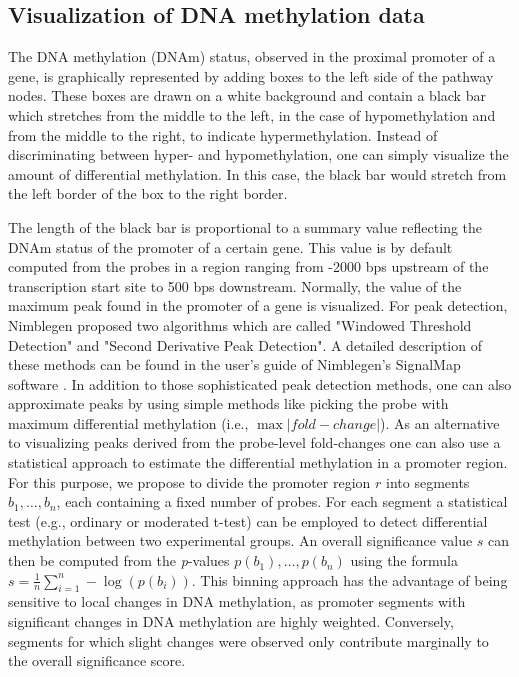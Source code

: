 \documentclass{bioinfo}
\begin{document}
\subsection{Visualization of DNA methylation data}

The DNA methylation (DNAm) status, observed in the proximal promoter of a gene, is graphically
represented by adding boxes to the left side of the pathway nodes. These boxes are drawn on a white
background and contain a black bar which stretches from the middle to the left, in the case of hypomethylation and from the middle to the right, to indicate hypermethylation. Instead of discriminating between hyper- and hypomethylation, one can simply visualize the amount of differential methylation. In this case, the black bar would stretch from the left border of the box to the right border.

The length of the black bar is proportional to a summary value reflecting the DNAm status of the
promoter of a certain gene.  This value is by default computed from the probes in a region ranging
from -2000 bps upstream of the transcription start site to 500 bps downstream. Normally, the
value of the maximum peak found in the promoter of a gene is visualized. For peak detection,
Nimblegen proposed two algorithms which are called "Windowed Threshold Detection" and
"Second Derivative Peak Detection". A detailed description of these methods can be found in the
user's guide of Nimblegen's SignalMap software \citep[see][]{NimblegenSignalMapUserGuide}.
In addition to those sophisticated peak detection methods, one can also approximate peaks by
using simple methods like picking the probe with maximum differential methylation (i.e., $\max|fold-change|$).
As an alternative to visualizing peaks derived from the probe-level fold-changes one can also use a statistical
approach to estimate the differential methylation in a promoter region. For this purpose, we
propose to divide the promoter region $r$ into segments $b_1,\dots,b_n$, each containing a fixed number of probes.
For each segment a statistical test (e.g., ordinary or moderated t-test) can be employed to detect
differential methylation between two experimental groups. An overall significance value $s$ can then be computed
from the \emph{p}-values $p(b_1),\dots,p(b_n)$ using the formula $s=\frac{1}{n}\sum\limits_{i=1}^n-\log(p(b_i))$.
This binning approach has the advantage of being sensitive to local changes in DNA methylation, as promoter segments with
significant changes in DNA methylation are highly weighted. Conversely, segments for which slight changes were observed only
contribute marginally to the overall significance score.
\end{document}
